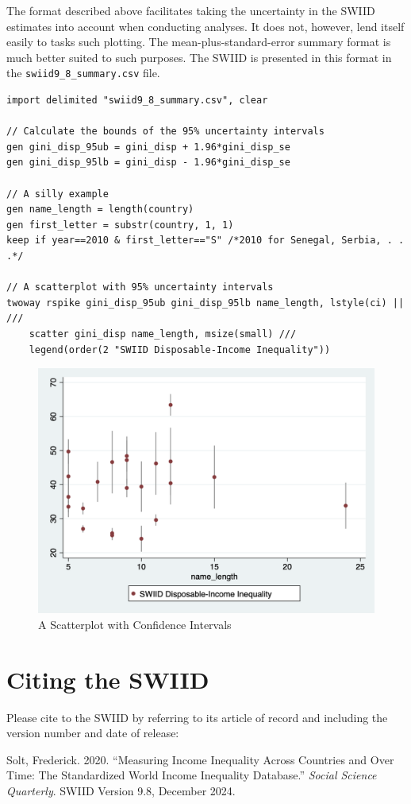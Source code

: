 \documentclass[11pt]{article}
\begin{document}
The format described above facilitates taking the uncertainty in the
SWIID estimates into account when conducting analyses. It does not,
however, lend itself easily to tasks such plotting. The
mean-plus-standard-error summary format is much better suited to such
purposes. The SWIID is presented in this format in the
\verb+swiid9_8_summary.csv+ file.


\begin{verbatim}
import delimited "swiid9_8_summary.csv", clear
 
// Calculate the bounds of the 95% uncertainty intervals
gen gini_disp_95ub = gini_disp + 1.96*gini_disp_se
gen gini_disp_95lb = gini_disp - 1.96*gini_disp_se

// A silly example
gen name_length = length(country)
gen first_letter = substr(country, 1, 1)
keep if year==2010 & first_letter=="S" /*2010 for Senegal, Serbia, . . .*/

// A scatterplot with 95% uncertainty intervals
twoway rspike gini_disp_95ub gini_disp_95lb name_length, lstyle(ci) || ///
    scatter gini_disp name_length, msize(small) ///
    legend(order(2 "SWIID Disposable-Income Inequality")) 
\end{verbatim}

\begin{figure}[htbp] 
	\caption{A Scatterplot with Confidence Intervals}
	\label{F:scatter}
	\includegraphics[width=6in]{stata_scatter.png}
\end{figure}

\pagebreak
\section{Citing the SWIID}

Please cite to the SWIID by referring to its article of record and including the version number and date of release:\\

\begin{hangparas}{.25in}{1}
Solt, Frederick. 2020. ``Measuring Income Inequality Across Countries and Over Time: The Standardized World Income Inequality Database.'' \emph{Social Science Quarterly}.  SWIID Version 9.8, December 2024.
\end{hangparas}




\pagebreak
\end{document}
